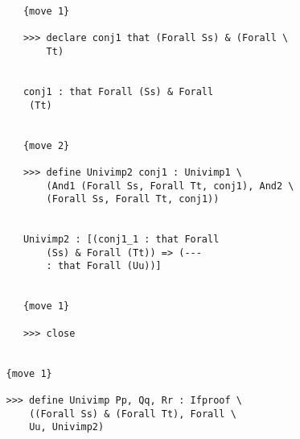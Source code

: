 \documentclass[12pt]{article}
\begin{document}
\begin{verbatim}
      {move 1}

      >>> declare conj1 that (Forall Ss) & (Forall \
          Tt)


      conj1 : that Forall (Ss) & Forall 
       (Tt)


      {move 2}

      >>> define Univimp2 conj1 : Univimp1 \
          (And1 (Forall Ss, Forall Tt, conj1), And2 \
          (Forall Ss, Forall Tt, conj1))


      Univimp2 : [(conj1_1 : that Forall 
          (Ss) & Forall (Tt)) => (--- 
          : that Forall (Uu))]


      {move 1}

      >>> close


   {move 1}

   >>> define Univimp Pp, Qq, Rr : Ifproof \
       ((Forall Ss) & (Forall Tt), Forall \
       Uu, Univimp2)



\end{verbatim}
\end{document}
